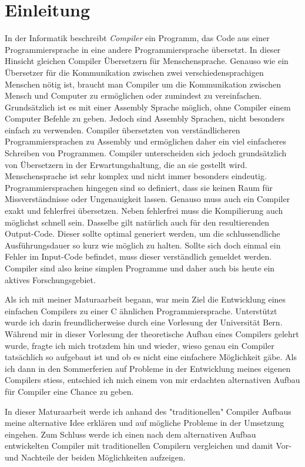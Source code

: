 \chapter{Einleitung}
In der Informatik beschreibt \textit{Compiler} ein Programm, das Code aus einer Programmiersprache in eine andere Programmiersprache übersetzt. In dieser Hinsicht gleichen Compiler Übersetzern für Menschensprache.
Genauso wie ein Übersetzer für die Kommunikation zwischen zwei verschiedensprachigen Menschen nötig ist, braucht man Compiler um die Kommunikation zwischen Mensch und Computer zu ermöglichen oder zumindest zu vereinfachen.
Grundsätzlich ist es mit einer Assembly Sprache möglich, ohne Compiler einem Computer Befehle zu geben. Jedoch sind Assembly Sprachen, nicht besonders einfach zu verwenden.
Compiler übersetzten von verständlicheren Programmiersprachen zu Assembly und ermöglichen daher ein viel einfacheres Schreiben von Programmen.
Compiler unterscheiden sich jedoch grundsätzlich von Übersetzern in der Erwartungshaltung, die an sie gestellt wird. Menschensprache ist sehr komplex und nicht immer besonders eindeutig. 
Programmiersprachen hingegen sind so definiert, dass sie keinen Raum für Missverständnisse oder Ungenauigkeit lassen. Genauso muss auch ein Compiler exakt und fehlerfrei übersetzen.
Neben fehlerfrei muss die Kompilierung auch möglichst schnell sein. Dasselbe gilt natürlich auch für den resultierenden Output-Code. Dieser sollte optimal generiert werden, um die schlussendliche
Ausführungsdauer so kurz wie möglich zu halten. Sollte sich doch einmal ein Fehler im Input-Code befindet, muss dieser verständlich gemeldet werden. Compiler sind also keine simplen Programme und daher auch bis heute
ein aktives Forschungsgebiet.

Als ich mit meiner Maturaarbeit begann, war mein Ziel die Entwicklung eines einfachen Compilers zu einer C ähnlichen Programmiersprache. Unterstützt wurde ich darin freundlicherweise durch eine Vorlesung der Universität Bern.
Während mir in dieser Vorlesung der theoretische Aufbau eines Compilers gelehrt wurde, fragte ich mich trotzdem hin und wieder, wieso genau ein Compiler tatsächlich so aufgebaut ist und
ob es nicht eine einfachere Möglichkeit gäbe. Als ich dann in den Sommerferien auf Probleme in der Entwicklung meines eigenen Compilers stiess, entschied ich mich einem von mir erdachten alternativen Aufbau für Compiler eine Chance zu geben. 

In dieser Maturaarbeit werde ich anhand des "traditionellen" Compiler Aufbaus meine alternative Idee erklären und auf mögliche Probleme in der Umsetzung eingehen.
Zum Schluss werde ich einen nach dem alternativen Aufbau entwickelten Compiler mit traditionellen Compilern vergleichen und damit Vor- und Nachteile der beiden Möglichkeiten aufzeigen.

